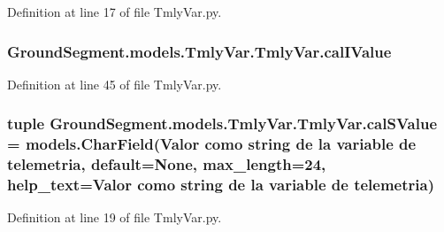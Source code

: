 Definition at line 17 of file Tmly\+Var.\+py.

\hypertarget{class_ground_segment_1_1models_1_1_tmly_var_1_1_tmly_var_a11e7f1de5e00c2422fc42474312d8e23}{}
\subsubsection[{cal\+I\+Value}]{\setlength{\rightskip}{0pt plus 5cm}Ground\+Segment.\+models.\+Tmly\+Var.\+Tmly\+Var.\+cal\+I\+Value}\label{class_ground_segment_1_1models_1_1_tmly_var_1_1_tmly_var_a11e7f1de5e00c2422fc42474312d8e23}


Definition at line 45 of file Tmly\+Var.\+py.

\hypertarget{class_ground_segment_1_1models_1_1_tmly_var_1_1_tmly_var_a49dc6e8d2412bdc61c595b4bdc3c2cbc}{}
\subsubsection[{cal\+S\+Value}]{\setlength{\rightskip}{0pt plus 5cm}tuple Ground\+Segment.\+models.\+Tmly\+Var.\+Tmly\+Var.\+cal\+S\+Value = models.\+Char\+Field(\textquotesingle{}Valor como string de la variable de telemetria\textquotesingle{}, default=None, max\+\_\+length=24, help\+\_\+text=\textquotesingle{}Valor como string de la variable de telemetria\textquotesingle{})\hspace{0.3cm}{\ttfamily [static]}}\label{class_ground_segment_1_1models_1_1_tmly_var_1_1_tmly_var_a49dc6e8d2412bdc61c595b4bdc3c2cbc}


Definition at line 19 of file Tmly\+Var.\+py.

\hypertarget{class_ground_segment_1_1models_1_1_tmly_var_1_1_tmly_var_ae310487e7ceeb1bbeae164bf4aec0290}{}
